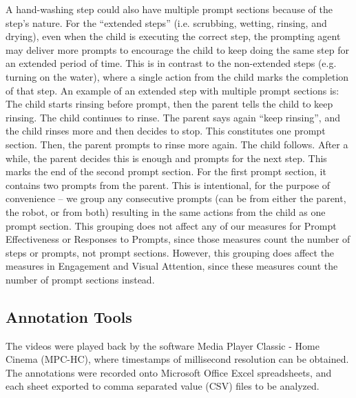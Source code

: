 A hand-washing step could also have multiple prompt sections because of the step's nature.  For the ``extended steps'' (i.e. scrubbing, wetting, rinsing, and drying), even when the child is executing the correct step, the prompting agent may deliver more prompts to encourage the child to keep doing the same step for an extended period of time.  This is in contrast to the non-extended steps (e.g. turning on the water), where a single action from the child marks the completion of that step.  An example of an extended step with multiple prompt sections is: The child starts rinsing before prompt, then the parent tells the child to keep rinsing.  The child continues to rinse.  The parent says again ``keep rinsing'', and the child rinses more and then decides to stop.  This constitutes one prompt section.  Then, the parent prompts to rinse more again.  The child follows.  After a while, the parent decides this is enough and prompts for the next step.  This marks the end of the second prompt section.  For the first prompt section, it contains two prompts from the parent.  This is intentional, for the purpose of convenience -- we group any consecutive prompts (can be from either the parent, the robot, or from both) resulting in the same actions from the child as one prompt section.  This grouping does not affect any of our measures for Prompt Effectiveness or Responses to Prompts, since those measures count the number of steps or prompts, not prompt sections.  However, this grouping does affect the measures in Engagement and Visual Attention, since these measures count the number of prompt sections instead.


\subsection{Annotation Tools}
The videos were played back by the software Media Player Classic - Home Cinema (MPC-HC), where timestamps of millisecond resolution can be obtained.  The annotations were recorded onto Microsoft Office Excel spreadsheets, and each sheet exported to comma separated value (CSV) files to be analyzed.

